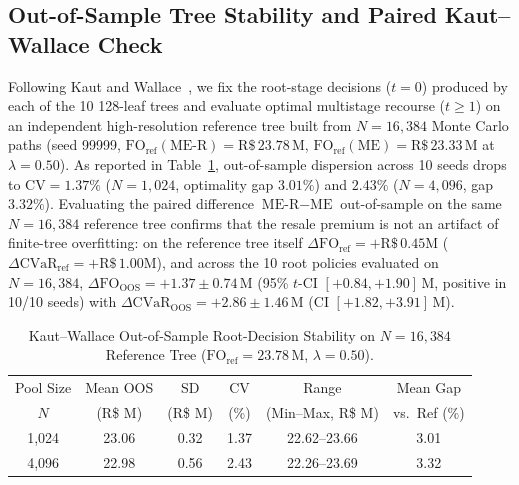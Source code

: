 \documentclass[10pt,journal]{IEEEtran}
\begin{document}
\subsection{Out-of-Sample Tree Stability and Paired Kaut--Wallace Check}
Following Kaut and Wallace~\cite{KautWallace2007}, we fix the root-stage decisions ($t=0$) produced by each of the 10 128-leaf trees and evaluate optimal multistage recourse ($t \ge 1$) on an independent high-resolution reference tree built from $N = 16,384$ Monte Carlo paths (seed 99999, $\mathrm{FO}_{\text{ref}}(\text{ME-R}) = \text{R\$}\,23.78\,\text{M}$, $\mathrm{FO}_{\text{ref}}(\text{ME}) = \text{R\$}\,23.33\,\text{M}$ at $\lambda = 0.50$). As reported in Table~\ref{tab:supp_kw}, out-of-sample dispersion across 10 seeds drops to $\text{CV} = 1.37\%$ ($N=1,024$, optimality gap $3.01\%$) and $2.43\%$ ($N=4,096$, gap $3.32\%$). Evaluating the paired difference $\text{ME-R} - \text{ME}$ out-of-sample on the same $N = 16,384$ reference tree confirms that the resale premium is not an artifact of finite-tree overfitting: on the reference tree itself $\Delta\mathrm{FO}_{\text{ref}} = +\text{R\$}\,0.45\text{M}$ ($\Delta\mathrm{CVaR}_{\text{ref}} = +\text{R\$}\,1.00\text{M}$), and across the 10 root policies evaluated on $N=16,384$, $\Delta\mathrm{FO}_{\text{OOS}} = +1.37 \pm 0.74\,\text{M}$ (95\% $t$-CI $[+0.84, +1.90]\,\text{M}$, positive in 10/10 seeds) with $\Delta\mathrm{CVaR}_{\text{OOS}} = +2.86 \pm 1.46\,\text{M}$ (CI $[+1.82, +3.91]\,\text{M}$).

\begin{table}[htbp]
\centering
\caption{Kaut--Wallace Out-of-Sample Root-Decision Stability on $N=16,384$ Reference Tree ($\mathrm{FO}_{\text{ref}} = 23.78\,\text{M}$, $\lambda=0.50$).}
\label{tab:supp_kw}
\scriptsize
\setlength{\tabcolsep}{3.0pt}
\begin{tabular}{cccccc}
\toprule
Pool Size & Mean OOS & SD & CV & Range & Mean Gap \\
$N$ & (R\$ M) & (R\$ M) & (\%) & (Min--Max, R\$ M) & vs.\ Ref (\%) \\
\midrule
1,024 & 23.06 & 0.32 & 1.37 & 22.62--23.66 & 3.01 \\
4,096 & 22.98 & 0.56 & 2.43 & 22.26--23.69 & 3.32 \\
\bottomrule
\end{tabular}
\end{table}
\end{document}
